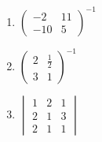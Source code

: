 \documentclass[11pt,a4paper]{article}
\begin{document}
\begin{enumerate}
\item $\displaystyle \begin{pmatrix} -2 & 11 \\ -10 & 5 \end{pmatrix}^{-1}$
\item $\displaystyle \begin{pmatrix} 2 & \frac{1}{2} \\ 3 & 1 \end{pmatrix}^{-1}$
\item $\displaystyle \begin{vmatrix} 1 & 2 & 1 \\ 2 & 1 & 3 \\ 2 & 1 & 1 \end{vmatrix}$
\end{enumerate}
\end{document}
